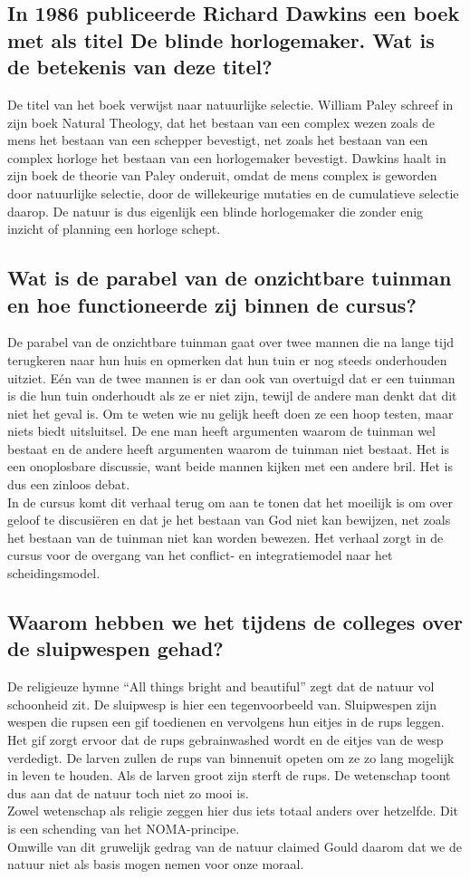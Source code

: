 \documentclass[11pt,a4paper,titlepage]{article}
\begin{document}
\subsection{In 1986 publiceerde Richard Dawkins een boek met als titel De blinde horlogemaker. Wat is de betekenis van deze titel?}
De titel van het boek verwijst naar natuurlijke selectie.  William Paley schreef in zijn boek Natural Theology, dat het bestaan van een complex wezen zoals de mens het bestaan van een schepper bevestigt, net zoals het bestaan van een complex horloge het bestaan van een horlogemaker bevestigt. Dawkins haalt in zijn boek de theorie van Paley onderuit, omdat de mens complex is geworden door natuurlijke selectie, door de willekeurige mutaties en de cumulatieve selectie daarop. De natuur is dus eigenlijk een blinde horlogemaker die zonder enig inzicht of planning een horloge schept.

\subsection{Wat is de parabel van de onzichtbare tuinman en hoe functioneerde zij binnen de cursus?}
De parabel van de onzichtbare tuinman gaat over twee mannen die na lange tijd terugkeren naar hun huis en opmerken dat hun tuin er nog steeds onderhouden uitziet. Eén van de twee mannen is er dan ook van overtuigd dat er een tuinman is die hun tuin onderhoudt als ze er niet zijn, tewijl de andere man denkt dat dit niet het geval is. Om te weten wie nu gelijk heeft doen ze een hoop testen, maar niets biedt uitsluitsel. De ene man heeft argumenten waarom de tuinman wel bestaat en de andere heeft argumenten waarom de tuinman niet bestaat. Het is een onoplosbare discussie, want beide mannen kijken met een andere bril. Het is dus een zinloos debat.\\
In de cursus komt dit verhaal terug om aan te tonen dat het moeilijk is om over geloof te discusiëren en dat je het bestaan van God niet kan bewijzen, net zoals het bestaan van de tuinman niet kan worden bewezen. Het verhaal zorgt in de cursus voor de overgang van het conflict- en integratiemodel naar het scheidingsmodel.

\subsection{Waarom hebben we het tijdens de colleges over de sluipwespen gehad?}
De religieuze hymne “All things bright and beautiful” zegt dat de natuur vol schoonheid zit. De sluipwesp is hier een tegenvoorbeeld van. Sluipwespen zijn wespen die rupsen een gif toedienen en vervolgens hun eitjes in de rups leggen. Het gif zorgt ervoor dat de rups gebrainwashed wordt en de eitjes van de wesp verdedigt. De larven zullen de rups van binnenuit opeten om ze zo lang mogelijk in leven te houden. Als de larven groot zijn sterft de rups. De wetenschap toont dus aan dat de natuur toch niet zo mooi is.\\
Zowel wetenschap als religie zeggen hier dus iets totaal anders over hetzelfde. Dit is een schending van het NOMA-principe.\\
Omwille van dit gruwelijk gedrag van de natuur claimed Gould daarom dat we de natuur niet als basis mogen nemen voor onze moraal.
\end{document}
